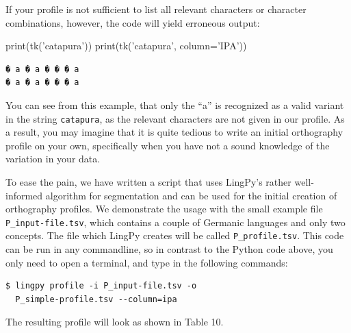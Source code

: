 \documentclass[a4paper,svgnames]{scrartcl}
\newenvironment{Shaded}{}{}
\newcommand{\StringTok}[1]{\textcolor[rgb]{0.25,0.44,0.63}{#1}}
\newcommand{\OperatorTok}[1]{\textcolor[rgb]{0.40,0.40,0.40}{#1}}
\newcommand{\BuiltInTok}[1]{#1}
\newcommand{\NormalTok}[1]{#1}
\begin{document}
If your profile is not sufficient to list all relevant characters or
character combinations, however, the code will yield erroneous output:

\begin{Shaded}
\begin{Highlighting}[]
\BuiltInTok{print}\NormalTok{(tk(}\StringTok{'catapura'}\NormalTok{))}
\BuiltInTok{print}\NormalTok{(tk(}\StringTok{'catapura'}\NormalTok{, column}\OperatorTok{=}\StringTok{'IPA'}\NormalTok{))}
\end{Highlighting}
\end{Shaded}

\begin{verbatim}
� a � a � � � a
� a � a � � � a
\end{verbatim}

You can see from this example, that only the ``a'' is recognized as a
valid variant in the string \texttt{catapura}, as the relevant
characters are not given in our profile. As a result, you may imagine
that it is quite tedious to write an initial orthography profile on your
own, specifically when you have not a sound knowledge of the variation
in your data.

To ease the pain, we have written a script that uses LingPy's rather
well-informed algorithm for segmentation and can be used for the initial
creation of orthography profiles. We demonstrate the usage with the
small example file \texttt{P\_input-file.tsv}, which contains a couple
of Germanic languages and only two concepts. The file which LingPy
creates will be called \texttt{P\_profile.tsv}. This code can be run in
any commandline, so in contrast to the Python code above, you only need
to open a terminal, and type in the following commands:

\begin{verbatim}
$ lingpy profile -i P_input-file.tsv -o 
  P_simple-profile.tsv --column=ipa
\end{verbatim}

The resulting profile will look as shown in Table 10.
\end{document}
